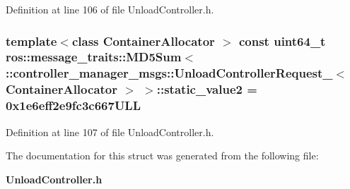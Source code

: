 \-Definition at line 106 of file \-Unload\-Controller.\-h.

\subsubsection[{static\-\_\-value2}]{\setlength{\rightskip}{0pt plus 5cm}template$<$class Container\-Allocator $>$ const uint64\-\_\-t ros\-::message\-\_\-traits\-::\-M\-D5\-Sum$<$ \-::{\bf controller\-\_\-manager\-\_\-msgs\-::\-Unload\-Controller\-Request\-\_\-}$<$ \-Container\-Allocator $>$ $>$\-::{\bf static\-\_\-value2} = 0x1e6eff2e9fc3c667\-U\-L\-L\hspace{0.3cm}{\ttfamily  [static]}}\label{structros_1_1message__traits_1_1MD5Sum_3_01_1_1controller__manager__msgs_1_1UnloadControllerRequ4afc64b6742d62450c8c4257a4394bbb_ad334096be0f0803d63f34f42d013d7fe}


\-Definition at line 107 of file \-Unload\-Controller.\-h.



\-The documentation for this struct was generated from the following file\-:\begin{DoxyCompactItemize}
\item 
{\bf \-Unload\-Controller.\-h}\end{DoxyCompactItemize}
